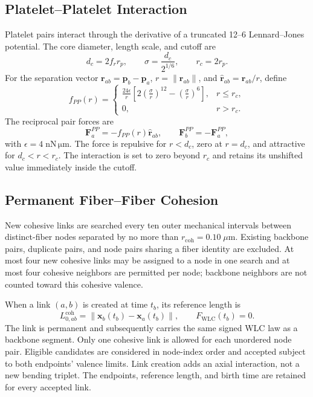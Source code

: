 \documentclass[twocolumn, 10pt]{article}
\begin{document}
\subsection{Platelet--Platelet Interaction}
Platelet pairs interact through the derivative of a truncated 12--6 Lennard--Jones potential. The core diameter, length scale, and cutoff are
\begin{equation}
d_c=2f_r r_p,\qquad
\sigma=\frac{d_c}{2^{1/6}},\qquad
r_c=2r_p.
\end{equation}
For the separation vector $\mathbf r_{ab}=\mathbf p_b-\mathbf p_a$, $r=\|\mathbf r_{ab}\|$, and $\widehat{\mathbf r}_{ab}=\mathbf r_{ab}/r$, define
\begin{equation}
f_{PP}(r)=
\begin{cases}
\displaystyle\frac{24\epsilon}{r}
\left[2\left(\frac{\sigma}{r}\right)^{12}
-\left(\frac{\sigma}{r}\right)^6\right],&r\le r_c,\\[3mm]
0,&r>r_c.
\end{cases}
\label{eq:platelet-platelet-scalar}
\end{equation}
The reciprocal pair forces are
\begin{equation}
\mathbf F_a^{PP}=-f_{PP}(r)\widehat{\mathbf r}_{ab},
\qquad
\mathbf F_b^{PP}=-\mathbf F_a^{PP},
\label{eq:platelet-platelet}
\end{equation}
with $\epsilon=4\;\mathrm{nN\,\mu m}$. The force is repulsive for $r<d_c$, zero at $r=d_c$, and attractive for $d_c<r<r_c$. The interaction is set to zero beyond $r_c$ and retains its unshifted value immediately inside the cutoff.

\subsection{Permanent Fiber--Fiber Cohesion}
New cohesive links are searched every ten outer mechanical intervals between distinct-fiber nodes separated by no more than $r_{\mathrm{coh}}=0.10\;\mu\mathrm{m}$. Existing backbone pairs, duplicate pairs, and node pairs sharing a fiber identity are excluded. At most four new cohesive links may be assigned to a node in one search and at most four cohesive neighbors are permitted per node; backbone neighbors are not counted toward this cohesive valence.

When a link $(a,b)$ is created at time $t_b$, its reference length is
\begin{equation}
L_{0,ab}^{\mathrm{coh}}
=\|\mathbf x_b(t_b)-\mathbf x_a(t_b)\|,
\qquad
F_{\mathrm{WLC}}(t_b)=0.
\label{eq:cohesion-birth}
\end{equation}
The link is permanent and subsequently carries the same signed WLC law as a backbone segment. Only one cohesive link is allowed for each unordered node pair. Eligible candidates are considered in node-index order and accepted subject to both endpoints' valence limits. Link creation adds an axial interaction, not a new bending triplet. The endpoints, reference length, and birth time are retained for every accepted link.
\end{document}
